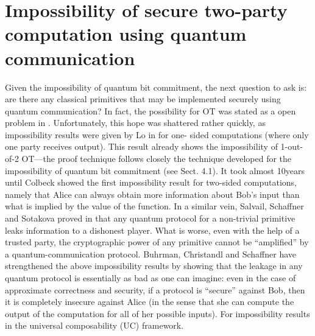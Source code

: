 \section{Impossibility of secure two-party computation using quantum communication}

Given the impossibility of quantum bit commitment, the next question to ask is: are there any classical primitives that may be implemented securely using quantum communication? In fact, the possibility for OT was stated as a open problem in \cite{Montrdal1996}. Unfortunately, this hope was shattered rather quickly, as impossibility results were given by Lo in \cite{Lo2008} for one- sided computations (where only one party receives output). This result already shows the impossibility of 1-out-of-2 OT—the proof technique follows closely the technique developed for the impossibility of quantum bit commitment (see Sect. 4.1). It took almost 10years until Colbeck showed the first impossibility result for two-sided computations, namely that Alice can always obtain more information about Bob’s input than what is implied by the value of the function. In a similar vein, Salvail, Schaffner and Sotakova proved in \cite{Salvail2015} that any quantum protocol for a non-trivial primitive leaks information to a dishonest player. What is worse, even with the help of a trusted party, the cryptographic power of any primitive cannot be “amplified” by a quantum-communication protocol.
Buhrman, Christandl and Schaffner have strengthened the above impossibility results
by showing that the leakage in any quantum protocol is essentially as bad as one can imagine: even in the case of approximate correctness and security, if a protocol is “secure” against Bob, then it is completely insecure against Alice (in the sense that she can compute the output of the computation for all of her possible inputs). For impossibility results in the universal composability (UC) framework.

